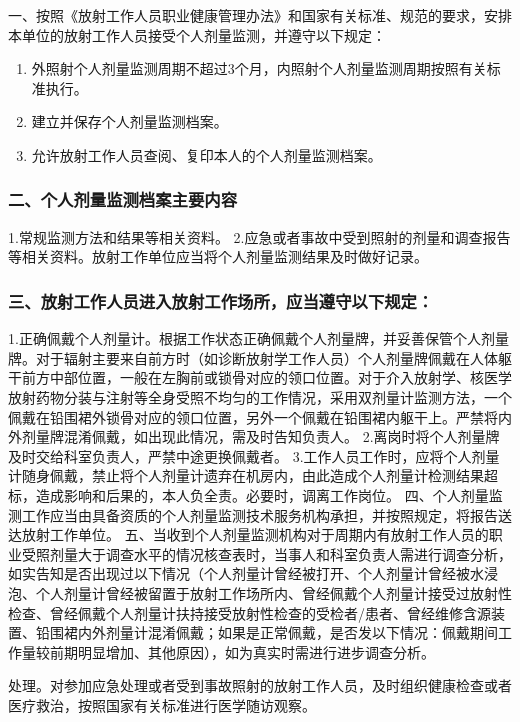 一、按照《放射工作人员职业健康管理办法》和国家有关标准、规范的要求，安排本单位的放射工作人员接受个人剂量监测，并遵守以下规定：

\begin{enumerate}
\item 外照射个人剂量监测周期不超过3个月，内照射个人剂量监测周期按照有关标准执行。
\item 建立并保存个人剂量监测档案。
\item 允许放射工作人员查阅、复印本人的个人剂量监测档案。
\end{enumerate}

\subsubsection{二、个人剂量监测档案主要内容}

1.常规监测方法和结果等相关资料。
2.应急或者事故中受到照射的剂量和调查报告等相关资料。放射工作单位应当将个人剂量监测结果及时做好记录。

\subsubsection{三、放射工作人员进入放射工作场所，应当遵守以下规定：}

1.正确佩戴个人剂量计。根据工作状态正确佩戴个人剂量牌，并妥善保管个人剂量牌。对于辐射主要来自前方时（如诊断放射学工作人员）个人剂量牌佩戴在人体躯干前方中部位置，一般在左胸前或锁骨对应的领口位置。对于介入放射学、核医学放射药物分装与注射等全身受照不均匀的工作情况，采用双剂量计监测方法，一个佩戴在铅围裙外锁骨对应的领口位置，另外一个佩戴在铅围裙内躯干上。严禁将内外剂量牌混淆佩戴，如出现此情况，需及时告知负责人。
2.离岗时将个人剂量牌及时交给科室负责人，严禁中途更换佩戴者。
3.工作人员工作时，应将个人剂量计随身佩戴，禁止将个人剂量计遗弃在机房内，由此造成个人剂量计检测结果超标，造成影响和后果的，本人负全责。必要时，调离工作岗位。
四、个人剂量监测工作应当由具备资质的个人剂量监测技术服务机构承担，并按照规定，将报告送达放射工作单位。
五、当收到个人剂量监测机构对于周期内有放射工作人员的职业受照剂量大于调查水平的情况核查表时，当事人和科室负责人需进行调查分析，如实告知是否出现过以下情况（个人剂量计曾经被打开、个人剂量计曾经被水浸泡、个人剂量计曾经被留置于放射工作场所内、曾经佩戴个人剂量计接受过放射性检查、曾经佩戴个人剂量计扶持接受放射性检查的受检者/患者、曾经维修含源装置、铅围裙内外剂量计混淆佩戴；如果是正常佩戴，是否发以下情况：佩戴期间工作量较前期明显增加、其他原因），如为真实时需进行进步调查分析。

处理。对参加应急处理或者受到事故照射的放射工作人员，及时组织健康检查或者医疗救治，按照国家有关标准进行医学随访观察。


